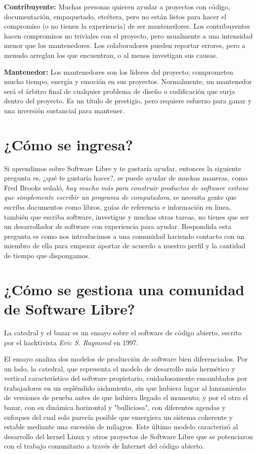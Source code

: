 \textbf{Contribuyente:} Muchas personas quieren ayudar a proyectos con código, documentación, empaquetado, etcétera, pero no están listos para hacer el compromiso (o no tienen la experiencia) de ser mantenedores. Los contribuyentes hacen compromisos no triviales con el proyecto, pero usualmente a una intensidad menor que los mantenedores. Los colaboradores pueden reportar errores, pero a menudo arreglan los que encuentran, o al menos investigan sus causas.

\textbf{Mantenedor:} Los mantenedores son los líderes del proyecto; comprometen mucho tiempo, energía y emoción en sus proyectos. Normalmente, un mantenedor será el árbitro final de cualquier problema de diseño o codificación que surja dentro del proyecto. Es un título de prestigio, pero requiere esfuerzo para ganar y una inversión sustancial para mantener.


\section{¿Cómo se ingresa?}
Si aprendimos sobre Software Libre y te gustaría ayudar, entonces la siguiente pregunta es, ¿qué te gustaría hacer?, se puede ayudar de muchas maneras, como Fred Brooks señaló, \textit{hay mucho más para construir productos de software exitoso que simplemente escribir un programa de computadora}, se necesita gente que escriba documentos como libros, guías de referencia e información en linea, también que escriba software, investigue y muchas otras tareas, no tienes que ser un desarrollador de software con experiencia para ayudar. Respondida esta pregunta es como nos introducimos a una comunidad haciendo contacto con un miembro de ella para empezar aportar de acuerdo a nuestro perfil y la cantidad de tiempo que dispongamos.
 

\section{¿Cómo se gestiona una comunidad de Software Libre?}
La catedral y el bazar es un ensayo sobre el software de código abierto, escrito por el hacktivista \textit{Eric S. Raymond} en 1997. 

El ensayo analiza dos modelos de producción de software bien diferenciados. Por un lado, la catedral, que representa el modelo de desarrollo más hermético y vertical característico del software propietario, cuidadosamente ensamblados por trabajadores en un espléndido aislamiento, sin que hubiera lugar al lanzamiento de versiones de prueba antes de que hubiera llegado el momento; y por el otro el bazar, con su dinámica horizontal y "bulliciosa", con diferentes agendas y enfoques del cual solo parecía posible que emergiera un sistema coherente y estable mediante una sucesión de milagros. Este último modelo caracterizó al desarrollo del kernel Linux y otros proyectos de Software Libre que se potenciaron con el trabajo comunitario a través de Internet del código abierto.

